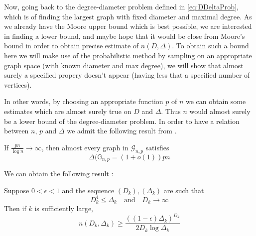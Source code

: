 Now, going back to the degree-diameter problem defined in \ref{eq:DDeltaProb}, which is of finding the largest graph with fixed diameter and maximal degree.
As we already have the Moore upper bound which is best possible, we are interested in finding a lower bound, and maybe hope that it would be close from Moore's bound in order to obtain precise estimate of $n(D, \Delta)$.
To obtain such a bound here we will make use of the probabilistic method by sampling on an appropriate graph space (with known diameter and max degree), we will show that almost surely a specified propery doesn't appear (having less that a specified number of vertices).
\newline

In other words, by choosing an appropriate function $p$ of $n$ we can obtain some estimates which are almost surely true on $D$ and $\Delta$. Thus $n$ would almost surely be a lower bound of the degree-diameter problem.
\newline
In order to have a relation between $n$, $p$ and $\Delta$ we admit the following result from \cite{Bollob01}.
\begin{theorem}\label{th:deltap}
	If $\frac{pn}{\log n} \to \infty$, then almost every graph in $\mathcal{G}_{n,p}$ satisfies 
	\begin{equation}
		\Delta(\mathbb{G}_{n,p} = (1+o(1))pn
	\end{equation}
\end{theorem}
We can obtain the following result :
\begin{theorem}
	Suppose $0<\epsilon <1$ and the sequence $(D_k), (\Delta_k)$ are such that 
	\begin{equation}
		D_k^4 \leq \Delta_k \quad \text{and} \quad D_k \to \infty
	\end{equation}
	Then if $k$ is sufficiently large,
	\begin{equation}
		n(D_k, \Delta_k) \geq \frac{((1-\epsilon)\Delta_k)^{D_k}}{2D_k\log \Delta_k}
	\end{equation}
\end{theorem}
